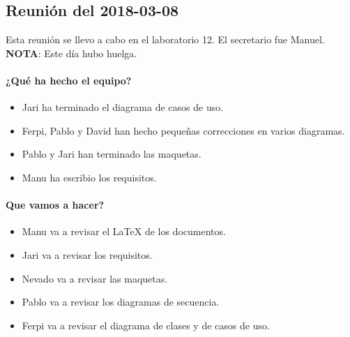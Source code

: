 \documentclass[a4paper, 12pt, spanish]{memoria}
\begin{document}
\subsection*{Reunión del 2018-03-08}
Esta reunión se llevo a cabo en el laboratorio 12. El secretario fue Manuel. \newline
\textbf{NOTA}: Este día hubo huelga.

\paragraph{¿Qué ha hecho el equipo?}
\begin{itemize}
  \item Jari ha terminado el diagrama de casos de uso.
  \item Ferpi, Pablo y David han hecho pequeñas correcciones en varios diagramas.
  \item Pablo y Jari han terminado las maquetas.
  \item Manu ha escribio los requisitos.
\end{itemize}

\paragraph{Que vamos a hacer?}
\begin{itemize}
        \item Manu va a revisar el \LaTeX{} de los documentos.
        \item Jari va a revisar los requisitos.
        \item Nevado va a revisar las maquetas.
        \item Pablo va a revisar los diagramas de secuencia. 
        \item Ferpi va a revisar el diagrama de clases y de casos de uso.
\end{itemize}
\end{document}
